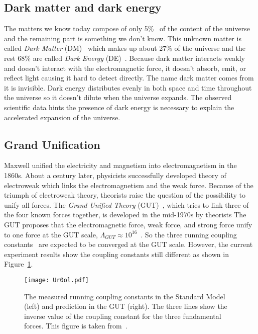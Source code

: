 \subsection{Dark matter and dark energy}
\label{subsec:sm_dm}
The matters we know today compose of only 5\%~\cite{arXiv:1212.5225v3,Ade:2013sjv} of the content of the universe and the remaining part is something we don't know.
This unknown matter is called \textit{Dark Matter} (DM)~\cite{j.physrep.2004.08.031} which makes up about 27\% of the universe and the rest 68\% are called \textit{Dark Energy} (DE)~\cite{arXiv:1212.5225v3,Ade:2013sjv}.
Because dark matter interacts weakly and doesn't interact with the electromagnetic force, it doesn't absorb, emit, or reflect light causing it hard to detect directly. 
The name dark matter comes from it is invisible.
Dark energy distributes evenly in both space and time throughout the universe so it doesn't dilute when the universe expands.
The observed scientific data hints the presence of dark energy is necessary to explain the accelerated expansion of the universe.


\subsection{Grand Unification}
\label{subsec:sm_grand_unification}
Maxwell unified the electricity and magnetism into electromagnetism in the 1860s.
About a century later, physicists successfully developed theory of electroweak which links the electromagnetism and the weak force.
Because of the triumph of electroweak theory, theorists raise the question of the possibility to unify all forces.
The \textit{Grand Unified Theory} (GUT)~\cite{0031-9112-37-10-029}, which tries to link three of the four known forces together, is developed in the mid-1970s by theorists
The GUT proposes that the electromagnetic force, weak force, and strong force unify to one force at the GUT scale, $\Lambda_{GUT} \approx 10^{16}$~{\GeV}.
So the three running coupling constants~\cite{RevModPhys.84.1527} are expected to be converged at the GUT scale.
However, the current experiment results show the coupling constants still different as shown in Figure~\ref{fig:sm_coulping_constants}.

\begin{figure}[htbp]
\begin{center}
\texttt{[image: Ur0ol.pdf]}
\caption{The measured running coupling constants in the Standard Model (left) and prediction in the GUT (right).
The three lines show the inverse value of the coupling constant for the three fundamental forces.
This figure is taken from~\cite{Ur0ol}.
}
\label{fig:sm_coulping_constants}
\end{center}
\end{figure}

